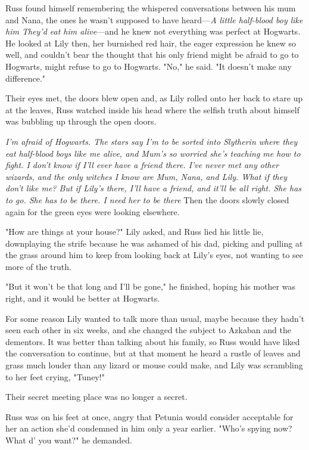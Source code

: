Russ found himself remembering the whispered conversations between his mum and Nana, the ones he wasn't supposed to have heard—\emph{A little half-blood boy like him{\el} They'd eat him alive}—and he knew not everything was perfect at Hogwarts. He looked at Lily then, her burnished red hair, the eager expression he knew so well, and couldn't bear the thought that his only friend might be afraid to go to Hogwarts, might refuse to go to Hogwarts. "No," he said. "It doesn't make any difference."

Their eyes met, the doors blew open and, as Lily rolled onto her back to stare up at the leaves, Russ watched inside his head where the selfish truth about himself was bubbling up through the open doors.

\emph{I'm afraid of Hogwarts. The stars say I'm to be sorted into Slytherin where they eat half-blood boys like me alive, and Mum's so worried she's teaching me how to fight. I don't know if I'll ever have a friend there. I've never met any other wizards, and the only witches I know are Mum, Nana, and Lily. What if they don't like me? But if Lily's there, I'll have a friend, and it'll be all right. She has to go. She has to be there. I need her to be there{\el}} Then the doors slowly closed again for the green eyes were looking elsewhere.

"How are things at your house?" Lily asked, and Russ lied his little lie, downplaying the strife because he was ashamed of his dad, picking and pulling at the grass around him to keep from looking back at Lily's eyes, not wanting to see more of the truth.

"But it won't be that long and I'll be gone," he finished, hoping his mother was right, and it would be better at Hogwarts.

For some reason Lily wanted to talk more than usual, maybe because they hadn't seen each other in six weeks, and she changed the subject to Azkaban and the dementors. It was better than talking about his family, so Russ would have liked the conversation to continue, but at that moment he heard a rustle of leaves and grass much louder than any lizard or mouse could make, and Lily was scrambling to her feet crying, "Tuney!"

Their secret meeting place was no longer a secret.

Russ was on his feet at once, angry that Petunia would consider acceptable for her an action she'd condemned in him only a year earlier. "Who's spying now? What d' you want?" he demanded.


